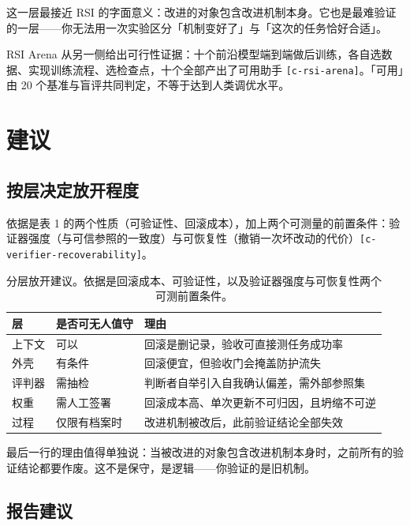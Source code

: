 这一层最接近 RSI 的字面意义：改进的对象包含改进机制本身。它也是最难验证的一层——你无法用一次实验区分「机制变好了」与「这次的任务恰好合适」。


RSI Arena 从另一侧给出可行性证据：十个前沿模型端到端做后训练，各自选数据、实现训练流程、选检查点，十个全部产出了可用助手 {\scriptsize\texttt{[c-\hspace{0pt}rsi-\hspace{0pt}arena]}}。「可用」由 20 个基准与盲评共同判定，不等于达到人类调优水平。


\section{建议}

\subsection{按层决定放开程度}

依据是表 1 的两个性质（可验证性、回滚成本），加上两个可测量的前置条件：验证器强度（与可信参照的一致度）与可恢复性（撤销一次坏改动的代价）{\scriptsize\texttt{[c-\hspace{0pt}verifier-\hspace{0pt}recoverability]}}。


\begin{table}[t]
\centering
\footnotesize
\setlength{\tabcolsep}{4pt}
\caption{分层放开建议。依据是回滚成本、可验证性，以及验证器强度与可恢复性两个可测前置条件。}
\label{tab:4}
\begin{tabular}{lll}
\toprule
层 & 是否可无人值守 & 理由 \\
\midrule
上下文 & 可以 & 回滚是删记录，验收可直接测任务成功率 \\
外壳 & 有条件 & 回滚便宜，但验收门会掩盖防护流失 \\
评判器 & 需抽检 & 判断者自举引入自我确认偏差，需外部参照集 \\
权重 & 需人工签署 & 回滚成本高、单次更新不可归因，且坍缩不可逆 \\
过程 & 仅限有档案时 & 改进机制被改后，此前验证结论全部失效 \\
\bottomrule
\end{tabular}
\end{table}

最后一行的理由值得单独说：当被改进的对象包含改进机制本身时，之前所有的验证结论都要作废。这不是保守，是逻辑——你验证的是旧机制。


\subsection{报告建议}

